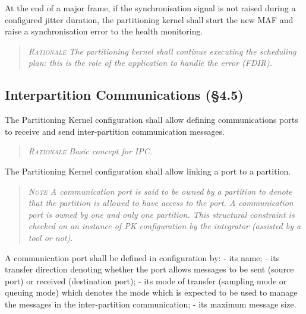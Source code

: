 At the end of a major frame, if the synchronisation signal is not raised during a configured jitter duration, the partitioning kernel shall start the new MAF and raise a synchronisation error to the health monitoring.
\begin{quote}\it
\textsc{Rationale}
The partitioning kernel shall continue executing the scheduling plan: this is the role of the application to handle the error (FDIR).
\end{quote}


%

\subsection{Interpartition Communications (\S4.5)}

The Partitioning Kernel configuration shall allow defining communications ports to receive and send inter-partition communication messages.
\begin{quote}\it
\textsc{Rationale}
Basic concept for IPC.
\end{quote}

The Partitioning Kernel configuration shall allow linking a port to a partition.
\begin{quote}\it
\textsc{Note}
A communication port is said to be owned by a partition to denote that the partition is allowed to have access to the port. A communication port is owned by one and only one partition. This structural constraint is checked on an instance of PK configuration by the integrator (assisted by a tool or not).
\end{quote}

A communication port shall be defined in configuration by:
- its name;
- its transfer direction denoting whether the port allows messages to be sent (source port) or received (destination port);
- its mode of transfer (sampling mode or queuing mode) which denotes the mode which is expected to be used to manage the messages in the inter-partition communication;
- its maximum message size.

